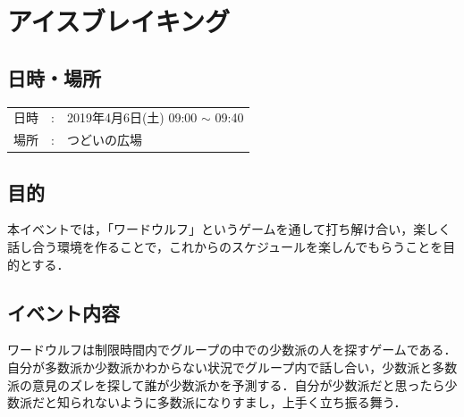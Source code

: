 \documentclass[a4j,titlepage]{jarticle}
\begin{document}
\section{アイスブレイキング}


\subsection{日時・場所}
\begin{tabular}{p{}rp{}}
  日時 & : & 2019年4月6日(土) 09:00 $\sim$ 09:40\\
  場所 & : & つどいの広場
\end{tabular}


\subsection{目的}
  本イベントでは，「ワードウルフ」というゲームを通して打ち解け合い，楽しく話し合う環境を作ることで，これからのスケジュールを楽しんでもらうことを目的とする．

\subsection{イベント内容}
  ワードウルフは制限時間内でグループの中での少数派の人を探すゲームである．自分が多数派か少数派かわからない状況でグループ内で話し合い，少数派と多数派の意見のズレを探して誰が少数派かを予測する．自分が少数派だと思ったら少数派だと知られないように多数派になりすまし，上手く立ち振る舞う．

\end{document}
